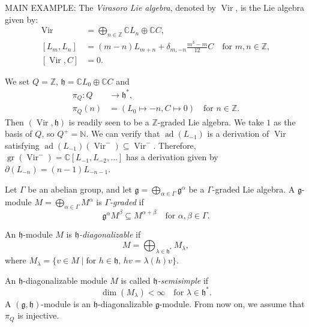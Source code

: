 \documentclass[a4paper, 12pt, reqno]{amsart}
\DeclareMathOperator{\Vir}{Vir}
\DeclareMathOperator{\gr}{gr}
\DeclareMathOperator{\ad}{ad}
\begin{document}
MAIN EXAMPLE: The \emph{Virasoro Lie algebra}, denoted by $\Vir$, is the Lie algebra given by:
\begin{align*}
  \Vir &= \bigoplus_{n \in \mathbb{Z}}\mathbb{C}L_n \oplus \mathbb{C}C, \\
  [L_m, L_n] &= (m - n)L_{m + n} + \delta_{m, -n}\frac{m^3 - m}{12}C \quad \text{for $m, n \in \mathbb{Z}$}, \\
  [\Vir, C] &= 0.
\end{align*}

We set $Q = \mathbb{Z}$, $\mathfrak{h} = \mathbb{C}L_0 \oplus \mathbb{C}C$ and
\begin{align*}
  \pi_Q: Q &\to \mathfrak{h}^*, \\
  \pi_Q(n) &= (L_0 \mapsto -n, C \mapsto 0) \quad \text{for $n \in \mathbb{Z}$}.
\end{align*}
Then $(\Vir, \mathfrak{h})$ is readily seen to be a $\mathbb{Z}$-graded Lie algebra.
We take $1$ as the basis of $Q$, so $Q^+ = \mathbb{N}$.
We can verify that $\ad(L_{-1})$ is a derivation of $\Vir$ satisfying $\ad(L_{-1})(\Vir^-) \subseteq \Vir^-$.
Therefore, $\gr(\Vir^-) = \mathbb{C}[L_{-1}, L_{-2}, \dots]$ has a derivation given by $\partial(L_{-n}) = (n - 1)L_{-n - 1}$.

Let $\Gamma$ be an abelian group, and let $\mathfrak{g} = \bigoplus_{\alpha \in \Gamma}\mathfrak{g}^{\alpha}$ be a $\Gamma$-graded Lie algebra.
A $\mathfrak{g}$-module $M = \bigoplus_{\alpha \in \Gamma}M^{\alpha}$ is \emph{$\Gamma$-graded} if
\begin{equation*}
  \mathfrak{g}^{\alpha}M^{\beta} \subseteq M^{\alpha + \beta} \quad \text{for $\alpha, \beta \in \Gamma$}.
\end{equation*}

An $\mathfrak{h}$-module $M$ is \emph{$\mathfrak{h}$-diagonalizable} if
\begin{equation*}
  M = \bigoplus_{\lambda \in \mathfrak{h}^*}M_{\lambda},
\end{equation*}
where $M_{\lambda} = \{v \in M \mid \text{for $h \in \mathfrak{h}$, $hv = \lambda(h)v$}\}$.

An $\mathfrak{h}$-diagonalizable module $M$ is called \emph{$\mathfrak{h}$-semisimple} if
\begin{equation*}
  \dim(M_{\lambda}) < \infty \quad \text{for $\lambda \in \mathfrak{h}^*$}.
\end{equation*}
A $(\mathfrak{g}, \mathfrak{h})$-module is an $\mathfrak{h}$-diagonalizable $\mathfrak{g}$-module.
From now on, we assume that $\pi_Q$ is injective.
\end{document}
